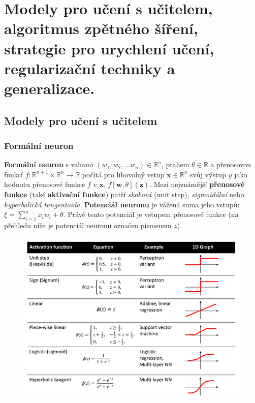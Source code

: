 \documentclass[11pt]{report} %
\newcommand{\R}{\mathbb{R}}
\renewcommand{\vec}[1]{\mathbf{#1}}
\begin{document}
\section{Modely pro učení s učitelem, algoritmus zpětného šíření, strategie pro urychlení učení, regularizační techniky a generalizace.}

\subsection{Modely pro učení s učitelem}
\subsubsection{Formální neuron}
\textbf{Formální neuron} s vahami $(w_1, w_2, \dots w_n) \in \R^n$, prahem $\theta \in \R$ a přenosovou funkcí $f : \R^{n+1} \times \R^n \rightarrow \R$ počítá pro libovolný vstup $\vec{x} \in \R^n$ svůj výstup $y$ jako hodnotu přenosové funkce $f$ v $\vec{x}$, $f[\vec{w}, \theta](\vec{z})$. Mezi nejznámější \textbf{přenosové funkce} (také \textbf{aktivační funkce}) patří \textit{skoková} (unit step), \textit{sigmoidální} nebo \textit{hyperbolická tangentoida}. \textbf{Potenciál neuronu} je vážená suma jeho vstupů: $\xi = \sum\limits_{i=1}^n x_i w_i + \theta$. Právě tento potenciál je vstupem přenosové funkce (na přehledu níže je potenciál neuronu označen písmenem $z$).

\begin{figure}[H]
	\centering
	\includegraphics[scale=0.7]{img/activation_functions.png}
\end{figure}
\end{document}
